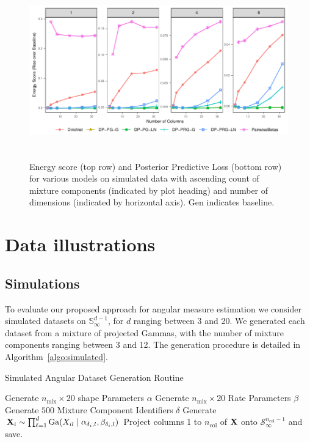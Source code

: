 
\begin{figure}[htb]
    \centering
    \caption{Energy score (top row) and Posterior Predictive Loss (bottom row) for various models on simulated data with ascending count of mixture components (indicated by plot heading) and number of dimensions (indicated by horizontal axis).  Gen indicates baseline.\label{fig:simpples}}
    \includegraphics[height=3in, width = \textwidth]{./images/sim_es_rise}
\end{figure}


\section{Data illustrations\label{sec:results}}

\subsection{Simulations\label{subsec:simulated}}

To evaluate our proposed approach for angular measure estimation 
    we consider simulated datasets on $\mathbb{S}_{\infty}^{d-1}$, for 
    $d$ ranging between 3 and 20. We generated each dataset from a mixture of projected Gammas, with 
    the number of mixture components ranging between 3 and 12.  The generation procedure is detailed 
    in Algorithm~\ref{algo:simulated}.
    \begin{algorithm}[ht]  %
        \caption{Simulated Angular Dataset Generation Routine\label{algo:simulated}}
        \begin{algorithmic}
            \State Generate $n_{\text{mix}} \times 20$ shape Parameters $\alpha$
            \State Generate $n_{\text{mix}} \times 20$ Rate Parameters $\beta$
            \State Generate $500$ Mixture Component Identifiers $\delta$
                \State Generate ${\bf X}_i \sim \prod_{\ell = 1}^d\text{Ga}\left(X_{il}\mid\alpha_{\delta_i,l},\beta_{\delta_i, l}\right)$
            \EndFor
                \State Project columns 1 to $n_{\text{col}}$ of ${\bf X}$ onto $\mathcal{S}_{\infty}^{n_{\text{col}} - 1}$ and save.
            \EndFor
        \EndFor
        \end{algorithmic}
    \end{algorithm}

